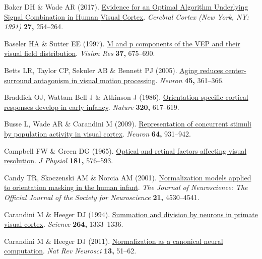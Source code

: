 \documentclass[
  letterpaper,
  DIV=11,
  numbers=noendperiod]{scrartcl}
\newlength{\cslhangindent}
\newenvironment{CSLReferences}[2] %
 {\begin{list}{}{%
  \setlength{\itemindent}{0pt}
  \setlength{\leftmargin}{0pt}
  \setlength{\parsep}{0pt}
  \ifodd #1
   \setlength{\leftmargin}{\cslhangindent}
   \setlength{\itemindent}{-1\cslhangindent}
  \fi
  \setlength{\itemsep}{#2\baselineskip}}}
 {\end{list}}
\begin{document}
\begin{CSLReferences}{1}{1}
Baker DH \& Wade AR (2017).
\href{https://doi.org/10.1093/cercor/bhw395}{Evidence for an {Optimal}
{Algorithm} {Underlying} {Signal} {Combination} in {Human} {Visual}
{Cortex}}. \emph{Cerebral Cortex (New York, NY: 1991)} \textbf{27,}
254--264.

Baseler HA \& Sutter EE (1997).
\href{https://doi.org/10.1016/s0042-6989(96)00209-x}{M and p components
of the VEP and their visual field distribution}. \emph{Vision Res}
\textbf{37,} 675--690.

Betts LR, Taylor CP, Sekuler AB \& Bennett PJ (2005).
\href{https://doi.org/10.1016/j.neuron.2004.12.041}{Aging reduces
center-surround antagonism in visual motion processing}. \emph{Neuron}
\textbf{45,} 361--366.

Braddick OJ, Wattam-Bell J \& Atkinson J (1986).
\href{https://doi.org/10.1038/320617a0}{Orientation-specific cortical
responses develop in early infancy}. \emph{Nature} \textbf{320,}
617--619.

Busse L, Wade AR \& Carandini M (2009).
\href{https://doi.org/10.1016/j.neuron.2009.11.004}{Representation of
concurrent stimuli by population activity in visual cortex}.
\emph{Neuron} \textbf{64,} 931--942.

Campbell FW \& Green DG (1965).
\href{https://doi.org/10.1113/jphysiol.1965.sp007784}{Optical and
retinal factors affecting visual resolution}. \emph{J Physiol}
\textbf{181,} 576--593.

Candy TR, Skoczenski AM \& Norcia AM (2001).
\href{https://doi.org/10.1523/JNEUROSCI.21-12-04530.2001}{Normalization
models applied to orientation masking in the human infant}. \emph{The
Journal of Neuroscience: The Official Journal of the Society for
Neuroscience} \textbf{21,} 4530--4541.

Carandini M \& Heeger DJ (1994).
\href{https://doi.org/10.1126/science.8191289}{Summation and division by
neurons in primate visual cortex}. \emph{Science} \textbf{264,}
1333--1336.

Carandini M \& Heeger DJ (2011).
\href{https://doi.org/10.1038/nrn3136}{Normalization as a canonical
neural computation}. \emph{Nat Rev Neurosci} \textbf{13,} 51--62.


\end{CSLReferences}
\end{document}
